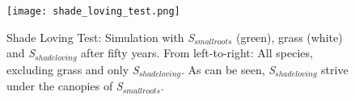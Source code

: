 \begin{figure}
\center
	\texttt{[image: shade\_loving\_test.png]}
	\caption{ Shade Loving Test: Simulation with \textit{S$_{smallroots}$} (green), grass (white) and \textit{S$_{shadeloving}$} after fifty years. From left-to-right: All species, excluding grass and only \textit{S$_{shadeloving}$}. As can be seen, \textit{S$_{shadeloving}$} strive under the canopies of \textit{S$_{smallroots}$}.}
	\label{fig:shade_loving_test}
\end{figure}

